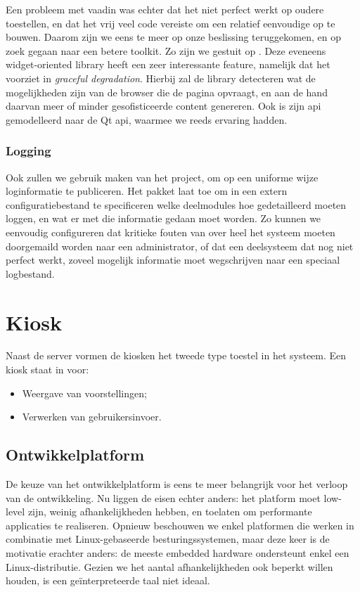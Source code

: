 Een probleem met vaadin was echter dat het niet perfect werkt op oudere toestellen, en dat het vrij veel code vereiste om een relatief eenvoudige  op te bouwen. Daarom zijn we eens te meer op onze beslissing teruggekomen, en op zoek gegaan naar een betere toolkit. Zo zijn we gestuit op . Deze eveneens widget-oriented library heeft een zeer interessante feature, namelijk dat het voorziet in \emph{graceful degradation}. Hierbij zal de library detecteren wat de mogelijkheden zijn van de browser die de pagina opvraagt, en aan de hand daarvan meer of minder gesofisticeerde content genereren. Ook is zijn \ac{api} gemodelleerd naar de Qt \ac{api}, waarmee we reeds ervaring hadden. 

\subsubsection{Logging}

Ook zullen we gebruik maken van het  project, om op een uniforme wijze loginformatie te publiceren. Het pakket laat toe om in een extern configuratiebestand te specificeren welke deelmodules hoe gedetailleerd moeten loggen, en wat er met die informatie gedaan moet worden. Zo kunnen we eenvoudig configureren dat kritieke fouten van over heel het systeem moeten doorgemaild worden naar een administrator, of dat een deelsysteem dat nog niet perfect werkt, zoveel mogelijk informatie moet wegschrijven naar een speciaal logbestand.

\section{Kiosk}
\label{ontwerp:applicatie:kiosk}

Naast de server vormen de kiosken het tweede type toestel in het systeem. Een kiosk staat in voor:
\begin{itemize}
\item Weergave van voorstellingen;
\item Verwerken van gebruikersinvoer.
\end{itemize}

\subsection{Ontwikkelplatform}

De keuze van het ontwikkelplatform is eens te meer belangrijk voor het verloop van de ontwikkeling. Nu liggen de eisen echter anders: het platform moet low-level zijn, weinig afhankelijkheden hebben, en toelaten om performante applicaties te realiseren. Opnieuw beschouwen we enkel platformen die werken in combinatie met Linux-gebaseerde besturingssystemen, maar deze keer is de motivatie erachter anders: de meeste embedded hardware ondersteunt enkel een Linux-distributie. Gezien we het aantal afhankelijkheden ook beperkt willen houden, is een geïnterpreteerde taal niet ideaal.

